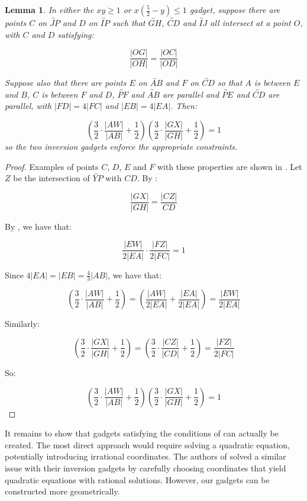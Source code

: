 \documentclass[11pt]{article}
\theoremstyle{plain}
\newtheorem{lemma}[theorem]{Lemma}
\theoremstyle{definition}
\numberwithin{theorem}{section}
\begin{document}
\begin{lemma}\label{lem:InversionGadgets}
In either the $xy\ge 1$ or $x\left(\frac{5}2-y\right)\le 1$ gadget, suppose there are points $C$ on $\overleftrightarrow{JP}$ and $D$ on $\overleftrightarrow{IP}$ such that $\overleftrightarrow{GH}$, $\overleftrightarrow{CD}$ and $\overleftrightarrow{IJ}$ all intersect at a point $O$, with $C$ and $D$ satisfying:

\[\frac{|OG|}{|OH|}=\frac{|OC|}{|OD|}\]

Suppose also that there are points $E$ on $\overleftrightarrow{AB}$ and $F$ on $\overleftrightarrow{CD}$ so that $A$ is between $E$ and $B$, $C$ is between $F$ and $D$, $\overleftrightarrow{PF}$ and $\overleftrightarrow{AB}$ are parallel and $\overleftrightarrow{PE}$ and $\overleftrightarrow{CD}$ are parallel, with $|FD|=4|FC|$ and $|EB|=4|EA|$. Then:

\[\left(\frac32\cdot\frac{|AW|}{|AB|}+\frac12\right)\left(\frac32\cdot\frac{|GX|}{|GH|}+\frac12\right)=1\]
so the two inversion gadgets enforce the appropriate constraints.
\end{lemma}

\begin{proof}
Examples of points $C$, $D$, $E$ and $F$ with these properties are shown in . Let $Z$ be the intersection of $\overleftrightarrow{YP}$ with $CD$. By :

\[\frac{|GX|}{|GH|}=\frac{|CZ|}{CD}\]

By , we have that:

\[\frac{|EW|}{2|EA|}\cdot\frac{|FZ|}{2|FC|}=1\]

Since $4|EA|=|EB|=\frac43|AB|$, we have that:

\[\left(\frac32\cdot\frac{|AW|}{|AB|}+\frac12\right)=\left(\frac{|AW|}{2|EA|}+\frac{|EA|}{2|EA|}\right)=\frac{|EW|}{2|EA|}\]

Similarly:

\[\left(\frac32\cdot\frac{|GX|}{|GH|}+\frac12\right)=\left(\frac32\cdot\frac{|CZ|}{|CD|}+\frac12\right)=\frac{|FZ|}{2|FC|}\]

So:

\[\left(\frac32\cdot\frac{|AW|}{|AB|}+\frac12\right)\left(\frac32\cdot\frac{|GX|}{|GH|}+\frac12\right)=1\]
\end{proof}

It remains to show that gadgets satisfying the conditions of  can actually be created. The most direct approach would require solving a quadratic equation, potentially introducing irrational coordinates. The authors of \cite{ExistsRHardness} solved a similar issue with their inversion gadgets by carefully choosing coordinates that yield quadratic equations with rational solutions. However, our gadgets can be constructed more geometrically.
\end{document}
